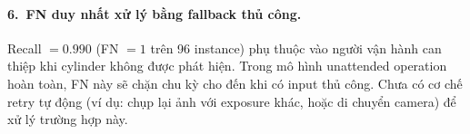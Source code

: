\paragraph{6.~FN duy nhất xử lý bằng fallback thủ công.}
Recall $= 0.990$ (FN $= 1$ trên 96 instance) phụ thuộc vào
người vận hành can thiệp khi cylinder không được phát hiện.
Trong mô hình unattended operation hoàn toàn, FN này sẽ
chặn chu kỳ cho đến khi có input thủ công. Chưa có cơ chế
retry tự động (ví dụ: chụp lại ảnh với exposure khác, hoặc
di chuyển camera) để xử lý trường hợp này.
